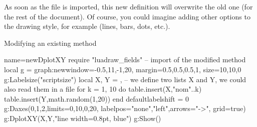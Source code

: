 As soon as the file is imported, this new definition will overwrite the old one (for the rest of the document). Of course, you could imagine adding other options to the drawing style, for example (lines, bars, dots, etc.).

\begin{demo}{Modifying an existing method}
\begin{luadraw}{name=newDplotXY}
require "luadraw_fields" -- import of the modified method
local g = graph:new{window={-0.5,11,-1,20}, margin={0.5,0.5,0.5,1}, size={10,10,0}}
g:Labelsize("scriptsize")
local X, Y = {}, {} -- we define two lists X and Y, we could also read them in a file
for k = 1, 10 do
    table.insert(X,"nom"..k)
    table.insert(Y,math.random(1,20))
end
defaultlabelshift = 0
g:Daxes({0,1,2},{limits={{0,10},{0,20}}, labelpos={"none","left"},arrows="->", grid=true})
g:DplotXY(X,Y,"line width=0.8pt, blue")
g:Show()
\end{luadraw}
\end{demo}
